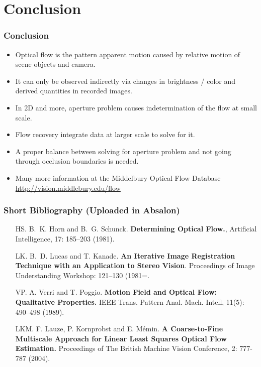 \documentclass[10pt]{beamer}
\begin{document}
\section{Conclusion}



\begin{frame}
  \frametitle{Conclusion}
  \begin{itemize}
  \item Optical flow is the pattern apparent motion caused by relative motion of scene objects and camera.
  \item It can only be observed indirectly via changes in brightness / color and derived
    quantities in recorded images.
  \item In 2D and more, aperture problem causes indetermination of the flow at small scale.
  \item Flow recovery integrate data at larger scale to solve for it.
  \item A proper balance between solving for aperture problem and not going through occlusion boundaries is needed.
  \item Many more information at the Middelbury Optical Flow Database \url{http://vision.middlebury.edu/flow}
  \end{itemize}
\end{frame}

\begin{frame}
  \frametitle{Short Bibliography (Uploaded in Absalon)}
  \begin{itemize}
  \item[HS.] B.~K. Horn and B.~G. Schunck. \textbf{Determining Optical
      Flow.}, Artificial Intelligence, 17: 185--203 (1981).
  \item[LK.] B.~D. Lucas and T. Kanade. \textbf{An Iterative Image
      Registration Technique with an Application to Stereo
      Vision}. Proceedings of Image Understanding Workshop:  121--130 (1981=.
  \item[VP.] A. Verri and T. Poggio. \textbf{Motion Field and Optical
      Flow: Qualitative Properties.} IEEE Trans. Pattern
    Anal. Mach. Intell, 11(5): 490--498 (1989).
  \item[LKM.] F. Lauze, P. Kornprobst and E. M{\'e}min. \textbf{A
      Coarse-to-Fine Multiscale Approach for Linear Least Squares
      Optical Flow Estimation.} Proceedings of The British Machine
    Vision Conference, 2: 777-787 (2004).
  \end{itemize}
\end{frame}
\end{document}
